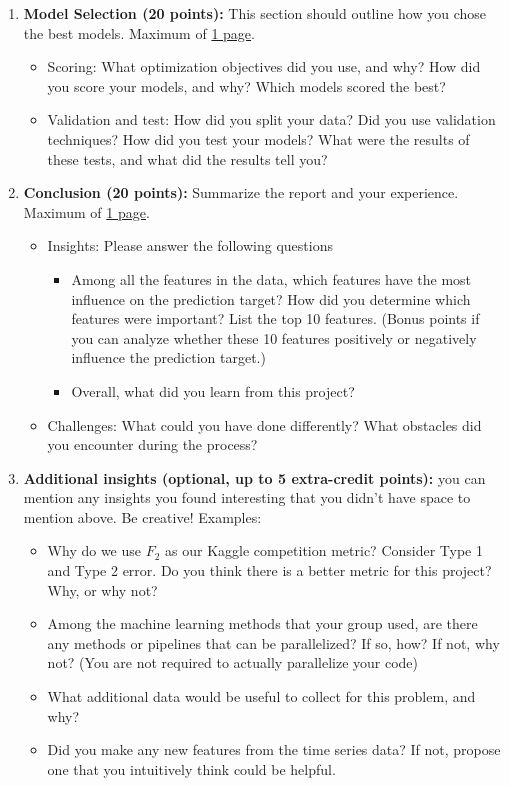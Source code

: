 \begin{enumerate}
\begin{itemize}
        
    \end{itemize}

    \item \textbf{Model Selection (20 points):} This section should outline how you chose the best models. Maximum of \underline{1 page}.
    \begin{itemize}
        \item Scoring: What optimization objectives did you use, and why? How did you score your models, and why? Which models scored the best?

        \item Validation and test: How did you split your data? Did you use validation techniques? How did you test your models? What were the results of these tests, and what did the results tell you?
    \end{itemize}

    \item \textbf{Conclusion (20 points):} Summarize the report and your experience. Maximum of \underline{1 page}.
    \begin{itemize}
        \item Insights: Please answer the following questions
        \begin{itemize}
            \item Among all the features in the data, which features have the most influence on the prediction target? How did you determine which features were important? List the top 10 features. (Bonus points if you can analyze whether these 10 features positively or negatively influence the prediction target.)
            \item Overall, what did you learn from this project?
        \end{itemize} 

        \item Challenges: What could you have done differently? What obstacles did you encounter during the process?
    \end{itemize}
    \item \textbf{Additional insights (optional, up to 5 extra-credit points):} you can mention any insights you found interesting that you didn't have space to mention above. Be creative! Examples:
        \begin{itemize}
            \item Why do we use $F_2$ as our Kaggle competition metric? Consider Type 1 and Type 2 error. Do you think there is a better metric for this project? Why, or why not?
            \item Among the machine learning methods that your group used, are there any methods or pipelines that can be parallelized? If so, how? If not, why not? (You are not required to actually parallelize your code)
            \item What additional data would be useful to collect for this problem, and why?
            \item Did you make any new features from the time series data? If not, propose one that you intuitively think could be helpful.
        \end{itemize}
\end{enumerate}

